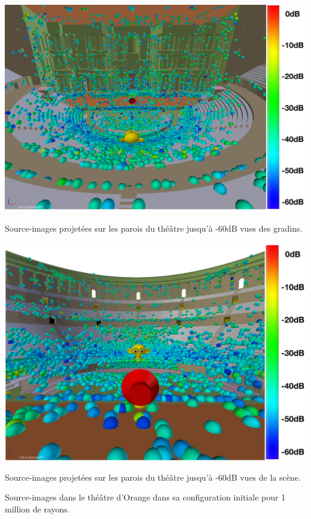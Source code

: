 \begin{figureth}
	\begin{subfigureth}{0.8\textwidth}
		\includegraphics[width=\linewidth]{images/SI60dB}
		\caption{Source-images projetées sur les parois du théâtre jusqu'à -60dB vues des gradins.}
		\label{SI60dB}
		\hfill
		\quad
	\end{subfigureth}
	\begin{subfigureth}{0.8\textwidth}
		\includegraphics[width=\linewidth]{images/SI60dBbis}
		\caption{Source-images projetées sur les parois du théâtre jusqu'à -60dB vues de la scène.}
		\label{SI60dBbis}
		\quad
	\end{subfigureth} 
\caption{Source-images dans le théâtre d'Orange dans sa configuration initiale pour 1 million de rayons.}	
\label{SITheatre60}
\end{figureth}
